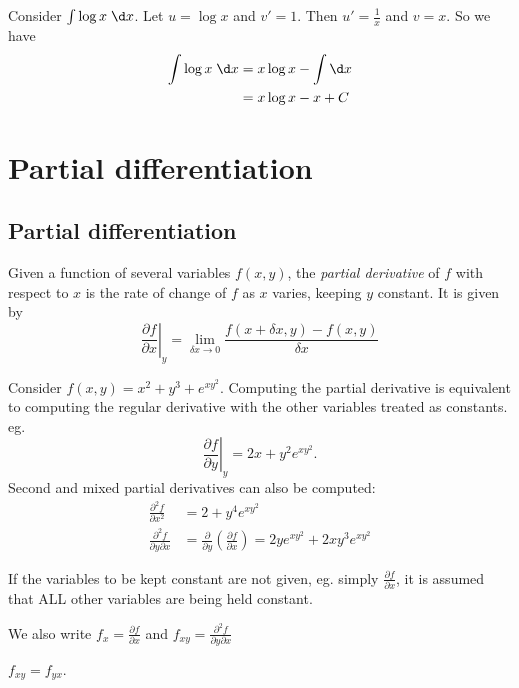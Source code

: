 \documentclass[a4paper]{article}
\begin{document}
  \begin{eg}
    Consider $\int \log x\; \d x$. Let $u = \log x$ and $v' = 1$. Then $u' = \frac{1}{x}$ and $v = x$. So we have
    \begin{align*}
      \int \log x\; \d x &= x\log x - \int \d x\\
      &= x \log x - x + C
    \end{align*}
  \end{eg}

  \section{Partial differentiation}
  \subsection{Partial differentiation}
  \begin{defi}
    Given a function of several variables $f(x, y)$, the \emph{partial derivative} of $f$ with respect to $x$ is the rate of change of $f$ as $x$ varies, keeping $y$ constant. It is given by
    \[
      \left. \frac{\partial f}{\partial x}\right|_y = \lim_{\delta x\to 0} \frac{f(x + \delta x, y) - f(x, y)}{\delta x}
    \]
  \end{defi}

  \begin{eg}
    Consider $f(x, y) = x^2 + y^3 + e^{xy^2}$. Computing the partial derivative is equivalent to computing the regular derivative with the other variables treated as constants. eg.
    \[
      \left.\frac{\partial f}{\partial y}\right|_y = 2x + y^2e^{xy^2}.
    \]
    Second and mixed partial derivatives can also be computed:
    \begin{align*}
      \frac{\partial^2f}{\partial x^2} &= 2 + y^4e^{xy^2}\\
      \frac{\partial^2 f}{\partial y\partial x} &= \frac{\partial}{\partial y}\left(\frac{\partial f}{\partial x}\right) = 2ye^{xy^2} + 2xy^{3}e^{xy^2}
    \end{align*}

  \end{eg}
  \begin{notation}
    If the variables to be kept constant are not given, eg. simply $\frac{\partial f}{\partial x}$, it is assumed that ALL other variables are being held constant.

    We also write $f_x = \frac{\partial f}{\partial x}$ and $f_{xy} = \frac{\partial^2 f}{\partial y\partial x}$
  \end{notation}
  \begin{thm}
    $f_{xy} = f_{yx}$.
  \end{thm}
\end{document}
